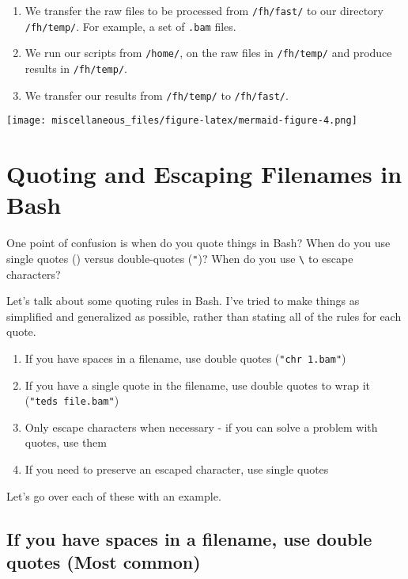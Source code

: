 \documentclass[
  letterpaper,
  DIV=11,
  numbers=noendperiod]{scrreprt}
\providecommand{\tightlist}{%
  \setlength{\itemsep}{0pt}\setlength{\parskip}{0pt}}
\begin{document}
\begin{enumerate}
\def\labelenumi{\alph{enumi}.}
\tightlist
\item
  We transfer the raw files to be processed from \texttt{/fh/fast/} to
  our directory \texttt{/fh/temp/}. For example, a set of \texttt{.bam}
  files.
\item
  We run our scripts from \texttt{/home/}, on the raw files in
  \texttt{/fh/temp/} and produce results in \texttt{/fh/temp/}.
\item
  We transfer our results from \texttt{/fh/temp/} to \texttt{/fh/fast/}.
\end{enumerate}

\texttt{[image: miscellaneous\_files/figure-latex/mermaid-figure-4.png]}

\section{Quoting and Escaping Filenames in
Bash}\label{quoting-and-escaping-filenames-in-bash}

One point of confusion is when do you quote things in Bash? When do you
use single quotes (\texttt{\textquotesingle{}}) versus double-quotes
(\texttt{"})? When do you use \texttt{\textbackslash{}} to escape
characters?

Let's talk about some quoting rules in Bash. I've tried to make things
as simplified and generalized as possible, rather than stating all of
the rules for each quote.

\begin{enumerate}
\def\labelenumi{\arabic{enumi}.}
\tightlist
\item
  If you have spaces in a filename, use double quotes
  (\texttt{"chr\ 1.bam"})
\item
  If you have a single quote in the filename, use double quotes to wrap
  it (\texttt{"ted\textquotesingle{}s\ file.bam"})
\item
  Only escape characters when necessary - if you can solve a problem
  with quotes, use them
\item
  If you need to preserve an escaped character, use single quotes
\end{enumerate}

Let's go over each of these with an example.

\subsection{If you have spaces in a filename, use double quotes (Most
common)}\label{if-you-have-spaces-in-a-filename-use-double-quotes-most-common}
\end{document}
